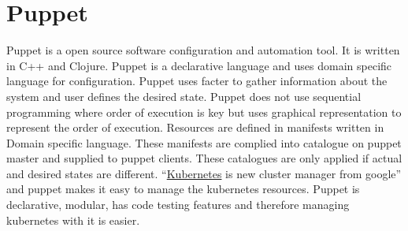 \section{Puppet}

Puppet\cite{hid-sp18-413-Puppet} is a open source software configuration and
automation tool. It is written in C++ and Clojure. Puppet is a declarative
language and uses domain specific language for configuration. Puppet uses facter
to gather information about the system and user defines the desired
state. Puppet does not use sequential programming where order of execution is
key but uses graphical representation to represent the order of
execution. Resources are defined in manifests written in Domain specific
language. These manifests are complied into catalogue on puppet master and
supplied to puppet clients. These catalogues are only applied if actual and
desired states are different.
“\href{https://en.wikipedia.org/wiki/Kubernetes}{Kubernetes} is new cluster
manager from google” and puppet makes it easy to manage the kubernetes
resources. Puppet is declarative, modular, has code testing features and
therefore managing kubernetes with it is easier.
